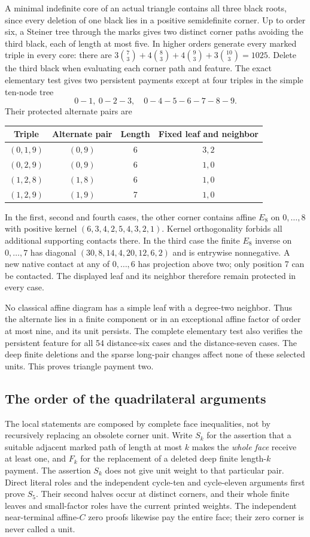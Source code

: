 \documentclass[11pt]{article}
\theoremstyle{remark}\newtheorem{remark}[theorem]{Remark}
\begin{document}
A minimal indefinite core of an actual triangle contains all three
black roots, since every deletion of one black lies in a positive
semidefinite corner. Up to order six, a Steiner tree through the
marks gives two distinct corner paths avoiding the third black,
each of length at most five. In higher orders generate every
marked triple in every core: there are
$3\binom73+4\binom83+4\binom93+3\binom{10}3=1025$.
Delete the third black when evaluating each corner path and feature.
The exact elementary test gives two persistent payments except
at four triples in the simple ten-node tree
\[
 0\! -\!1,\ 0\! -\!2\! -\!3,\quad
 0\! -\!4\! -\!5\! -\!6\! -\!7\! -\!8\! -\!9.
\]
Their protected alternate pairs are
\begin{center}
\begin{tabular}{c|c|c|c}
Triple&Alternate pair&Length&Fixed leaf and neighbor\\\hline
$(0,1,9)$&$(0,9)$&6&$3,2$\\
$(0,2,9)$&$(0,9)$&6&$1,0$\\
$(1,2,8)$&$(1,8)$&6&$1,0$\\
$(1,2,9)$&$(1,9)$&7&$1,0$
\end{tabular}
\end{center}
In the first, second and fourth cases, the other corner contains
affine $E_8$ on $0,\ldots,8$ with positive kernel
$(6,3,4,2,5,4,3,2,1)$. Kernel orthogonality forbids all additional
supporting contacts there. In the third case the finite $E_8$
inverse on $0,\ldots,7$ has diagonal
$(30,8,14,4,20,12,6,2)$ and is entrywise nonnegative. A new native
contact at any of $0,\ldots,6$ has projection above two; only
position 7 can be contacted. The displayed leaf and its neighbor
therefore remain protected in every case.

No classical affine diagram has a simple leaf with a degree-two
neighbor. Thus the alternate lies in a finite component or in an
exceptional affine factor of order at most nine, and its unit
persists. The complete elementary test also verifies the persistent
feature for all 54 distance-six cases and the distance-seven cases.
The deep finite deletions and the sparse long-pair changes affect
none of these selected units. This proves triangle payment two.

\subsection{The order of the quadrilateral arguments}

The local statements are composed by complete face inequalities,
not by recursively replacing an obsolete corner unit.
Write $S_k$ for the assertion that a suitable adjacent marked
path of length at most $k$ makes the \emph{whole face} receive at
least one, and $F_k$ for the replacement of a deleted deep finite
length-$k$ payment. The assertion $S_k$ does not give unit weight
to that particular pair. Direct literal roles and the independent
cycle-ten and cycle-eleven arguments first prove $S_5$. Their
second halves occur at distinct corners, and their whole finite
leaves and small-factor roles have the current printed weights.
The independent near-terminal affine-$C$ zero proofs likewise
pay the entire face; their zero corner is never called a unit.
\end{document}

